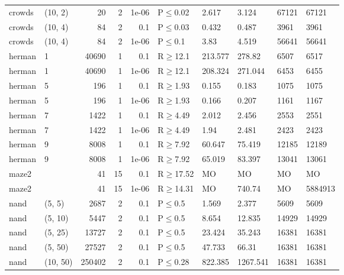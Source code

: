 \begin{longtable}{llrrrlllll}
 crowds        & (10, 2)   &     	20 &   2 & 1e-06 & P$\leq$0.02  & 2.617   & 3.124    & 67121  & 67121   \\
 crowds        & (10, 4)   &     	84 &   2 & 0.1   & P$\leq$0.03  & 0.432   & 0.487    & 3961   & 3961    \\
 crowds        & (10, 4)   &     	84 &   2 & 1e-06 & P$\leq$0.1   & 3.83    & 4.519    & 56641  & 56641   \\
 herman        & 1         &  	40690 &   1 & 0.1   & R$\geq$12.1  & 213.577 & 278.82   & 6507   & 6517    \\
 herman        & 1         &  	40690 &   1 & 1e-06 & R$\geq$12.1  & 208.324 & 271.044  & 6453   & 6455    \\
 herman        & 5         &    	196 &   1 & 0.1   & R$\geq$1.93  & 0.155   & 0.183    & 1075   & 1075    \\
 herman        & 5         &    	196 &   1 & 1e-06 & R$\geq$1.93  & 0.166   & 0.207    & 1161   & 1167    \\
 herman        & 7         &   	1422 &   1 & 0.1   & R$\geq$4.49  & 2.012   & 2.456    & 2553   & 2551    \\
 herman        & 7         &   	1422 &   1 & 1e-06 & R$\geq$4.49  & 1.94    & 2.481    & 2423   & 2423    \\
 herman        & 9         &   	8008 &   1 & 0.1   & R$\geq$7.92  & 60.647  & 75.419   & 12185  & 12189   \\
 herman        & 9         &   	8008 &   1 & 1e-06 & R$\geq$7.92  & 65.019  & 83.397   & 13041  & 13061   \\
 maze2         &           &     	41 &  15 & 0.1   & R$\geq$17.52 & MO      & MO       & MO     & MO      \\
 maze2         &           &     	41 &  15 & 1e-06 & R$\geq$14.31 & MO      & 740.74   & MO     & 5884913 \\
 nand          & (5, 5)    &   	2687 &   2 & 0.1   & P$\leq$0.5   & 1.569   & 2.377    & 5609   & 5609    \\
 nand          & (5, 10)   &   	5447 &   2 & 0.1   & P$\leq$0.5   & 8.654   & 12.835   & 14929  & 14929   \\
 nand          & (5, 25)   &  	13727 &   2 & 0.1   & P$\leq$0.5   & 23.424  & 35.243   & 16381  & 16381   \\
 nand          & (5, 50)   &  	27527 &   2 & 0.1   & P$\leq$0.5   & 47.733  & 66.31    & 16381  & 16381   \\
 nand          & (10, 50)  & 	250402 &   2 & 0.1   & P$\leq$0.28  & 822.385 & 1267.541 & 16381  & 16381   \\

\end{longtable}
